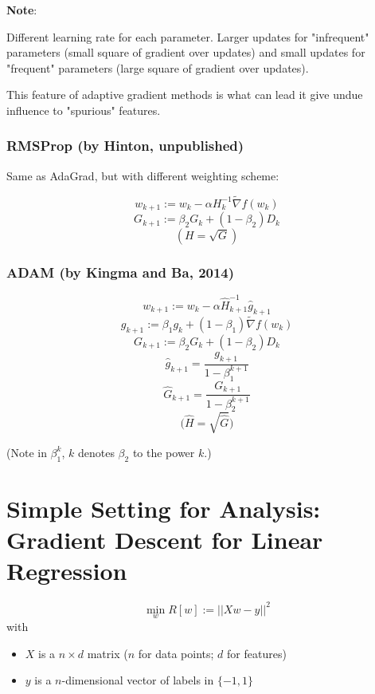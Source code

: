 \documentclass[12pt]{article}
\begin{document}
\vspace{3mm}
\textbf{Note}: 


Different learning rate for each parameter. Larger updates for "infrequent" parameters (small square of gradient over updates) and small updates for "frequent" parameters (large square of gradient over updates).

This feature of adaptive gradient methods is what can lead it give undue influence to "spurious" features.

\subsubsection{RMSProp (by Hinton, unpublished)}
Same as AdaGrad, but with different weighting scheme:

$$w_{k+1} := w_{k} - \alpha H^{ -1}_k \tilde{ \nabla } f ( w_k )$$
$$G_{k+1} := \beta_2 G_k + (1-\beta_2) D_k$$
$$( H = \sqrt{G} ) $$

\subsubsection{ADAM (by Kingma and Ba, 2014)}
$$w_{k+1} := w_{k} - \alpha \hat{H}^{ -1}_{k+1} \hat{g}_{k+1}$$
$$g_{k+1} := \beta_1 g_k + (1 - \beta_1) \tilde{ \nabla } f ( w_k )$$
$$G_{k+1} := \beta_2 G_k +(1 - \beta_2) D_k$$
$$\hat{ g }_{k+1} = \frac{ g_{k+1} }{1 - \beta_1^{k+1}} $$
$$\hat{ G }_{k+1}  = \frac{ G_{k+1} }{ 1 - \beta_2^{k+1} } $$
$$\big( \hat{H} = \sqrt{ \hat{G} } \big) $$

(Note in $\beta_1^k$, $k$ denotes $\beta_2$ to the power $k$.)

\newpage

\section{Simple Setting for Analysis: Gradient Descent for Linear Regression}

$$\min_w R[w] := || Xw - y ||^2$$
with
\begin{itemize}
	\item $X$ is a $n \times d$ matrix ($n$ for data points; $d$ for features)
	\item $y$ is a $n$-dimensional vector of labels in $\{-1, 1\}$
\end{itemize}
\end{document}
